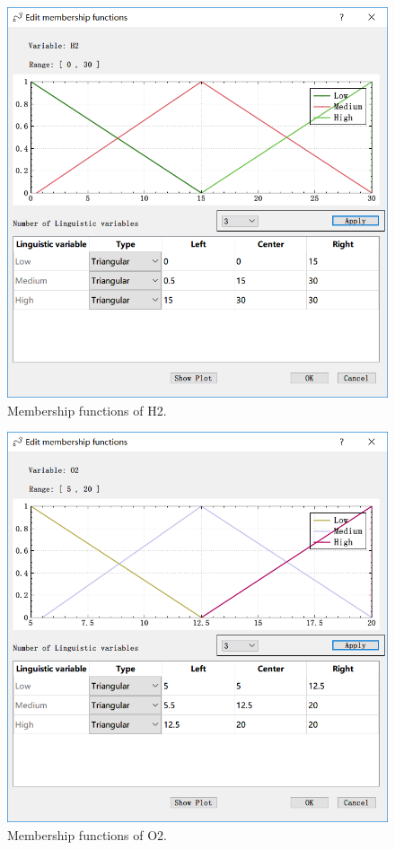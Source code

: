 \documentclass[journal,a4paper,onecolumn]{article}
\begin{document}
\begin{figure}[!hbt]
	\begin{center}
		\includegraphics[width=0.8\columnwidth]{fig9}
		\caption{Membership functions of H2.}
		\label{fig:Membership functions of H2}
	\end{center}
\end{figure}

\begin{figure}[!hbt]
	\begin{center}
		\includegraphics[width=0.8\columnwidth]{fig9_1}
		\caption{Membership functions of O2.}
		\label{fig:Membership functions of O2}
	\end{center}
\end{figure}
\end{document}
